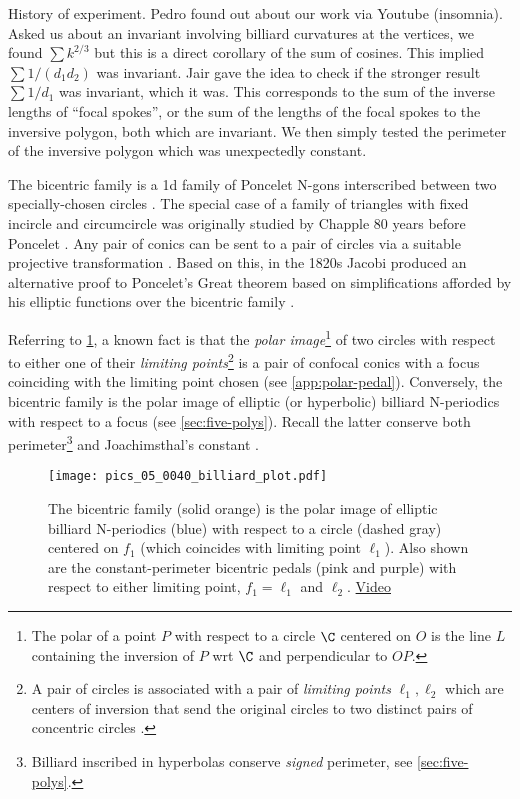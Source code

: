 

History of experiment. Pedro found out about our work via Youtube (insomnia). Asked us about an invariant involving billiard curvatures at the vertices, we found $\sum{k^{2/3}}$ but this is a direct corollary of the sum of cosines. This implied $\sum{1/(d_1 d_2)}$ was invariant. Jair gave the idea to check if the stronger result $\sum{1/d_1}$ was invariant, which it was. This corresponds to the sum of the inverse lengths of ``focal spokes'', or the sum of the lengths of the focal spokes to the inversive polygon, both which are invariant. We then simply tested the perimeter of the inversive polygon which was unexpectedly constant.



The bicentric family is a 1d family of Poncelet N-gons interscribed between two specially-chosen circles \cite[Poncelet's Porism]{mw}. The special case of a family of triangles with fixed incircle and circumcircle was originally studied by Chapple 80 years before Poncelet \cite{odehnal2011-poristic}. Any pair of conics can be sent to a pair of circles via a suitable projective transformation \cite{akopyan2007-conics}. Based on this, in the 1820s Jacobi produced an alternative proof to Poncelet's Great theorem based on simplifications afforded by his elliptic functions over the bicentric family \cite{bos-1987,dragovic11,nash2018-poncelet}.

Referring to
\cref{fig:confocal}, a known fact is that the {\em polar image}\footnote{The polar of a point $P$ with respect to a circle $\C$ centered on $O$ is the line $L$ containing the inversion of $P$ wrt $\C$ and perpendicular to $OP$.} of two circles with respect to either one of their {\em limiting points}\footnote{A pair of circles is associated with a pair of {\em limiting points} $\ell_1,\ell_2$ which are centers of inversion that send the original circles to two distinct pairs of concentric circles \cite[Limiting Points]{mw}.} is a pair of confocal conics with a focus coinciding with the limiting point chosen \cite{akopyan2007-conics} (see \cref{app:polar-pedal}). Conversely, the bicentric family is the polar image of elliptic (or hyperbolic) billiard N-periodics with respect to a focus (see \cref{sec:five-polys}). Recall the latter conserve both perimeter\footnote{Billiard inscribed in hyperbolas conserve {\em signed} perimeter, see \cref{sec:five-polys}.} and Joachimsthal's constant \cite{sergei91}.

\begin{figure}
    \centering
    \texttt{[image: pics\_05\_0040\_billiard\_plot.pdf]}
    \caption{The bicentric family  (solid orange) is the polar image of elliptic billiard N-periodics (blue) with respect to a circle (dashed gray) centered on $f_1$ (which coincides with limiting point $\ell_1$). Also shown are the constant-perimeter bicentric pedals (pink and purple) with respect to either limiting point, $f_1=\ell_1$ and $\ell_2$.  \href{https://youtu.be/8m21fCz8eX4}{Video}}
    \label{fig:confocal}
\end{figure}

